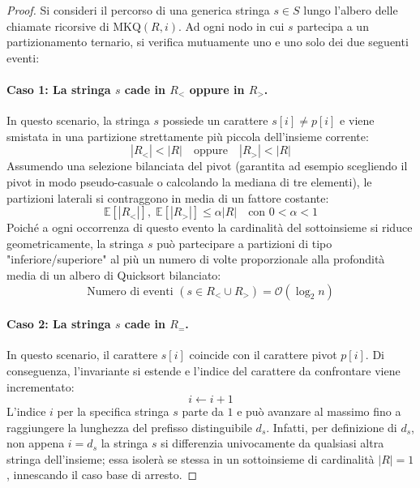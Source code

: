 \begin{proof}
Si consideri il percorso di una generica stringa $s \in S$ lungo l'albero delle chiamate ricorsive di $\text{MKQ}(R, i)$. Ad ogni nodo in cui $s$ partecipa a un partizionamento ternario, si verifica mutuamente uno e uno solo dei due seguenti eventi:

\paragraph{Caso 1: La stringa $s$ cade in $R_<$ oppure in $R_>$.}
In questo scenario, la stringa $s$ possiede un carattere $s[i] \neq p[i]$ e viene smistata in una partizione strettamente pi\`u piccola dell'insieme corrente:
\begin{equation}
  |R_<| < |R| \quad \text{oppure} \quad |R_>| < |R|
\end{equation}
Assumendo una selezione bilanciata del pivot (garantita ad esempio scegliendo il pivot in modo pseudo-casuale o calcolando la mediana di tre elementi), le partizioni laterali si contraggono in media di un fattore costante:
\begin{equation}
  \mathbb{E}[|R_<|], \; \mathbb{E}[|R_>|] \le \alpha |R| \quad \text{con } 0 < \alpha < 1
\end{equation}
Poich\'e a ogni occorrenza di questo evento la cardinalit\`a del sottoinsieme si riduce geometricamente, la stringa $s$ pu\`o partecipare a partizioni di tipo "inferiore/superiore" al pi\`u un numero di volte proporzionale alla profondit\`a media di un albero di Quicksort bilanciato:
\begin{equation}
  \text{Numero di eventi } (s \in R_< \cup R_>) = \mathcal{O}(\log_2 n)
\end{equation}

\paragraph{Caso 2: La stringa $s$ cade in $R_=$.}
In questo scenario, il carattere $s[i]$ coincide con il carattere pivot $p[i]$. Di conseguenza, l'invariante si estende e l'indice del carattere da confrontare viene incrementato:
\begin{equation}
  i \leftarrow i + 1
\end{equation}
L'indice $i$ per la specifica stringa $s$ parte da $1$ e pu\`o avanzare al massimo fino a raggiungere la lunghezza del prefisso distinguibile $d_s$. Infatti, per definizione di $d_s$, non appena $i = d_s$ la stringa $s$ si differenzia univocamente da qualsiasi altra stringa dell'insieme; essa isoler\`a se stessa in un sottoinsieme di cardinalit\`a $|R| = 1$, innescando il caso base di arresto.


\end{proof}
